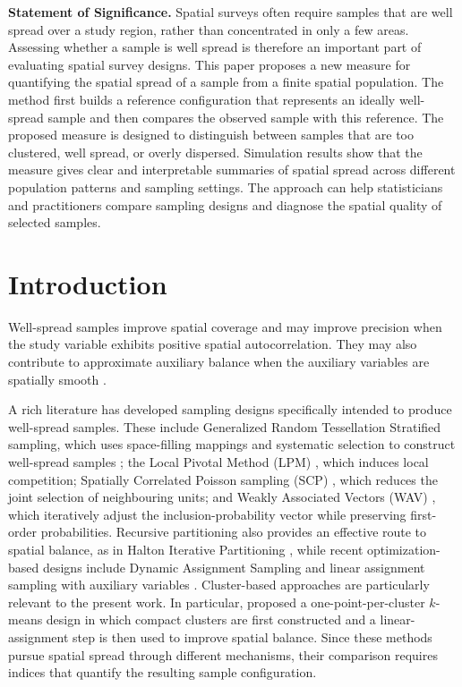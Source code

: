 \documentclass[12pt]{imsart}
\theoremstyle{plain}
\theoremstyle{remark}
\begin{document}
\noindent\textbf{Statement of Significance.}
Spatial surveys often require samples that are well spread over a study region,
rather than concentrated in only a few areas. Assessing whether a sample is
well spread is therefore an important part of evaluating spatial survey designs.
This paper proposes a new measure for quantifying the spatial spread of a
sample from a finite spatial population. The method first builds a reference
configuration that represents an ideally well-spread sample and then compares
the observed sample with this reference. The proposed measure is designed to
distinguish between samples that are too clustered, well spread, or overly
dispersed. Simulation results show that the measure gives clear and
interpretable summaries of spatial spread across different population patterns
and sampling settings. The approach can help statisticians and practitioners
compare sampling designs and diagnose the spatial quality of selected samples.

\section{Introduction}
Well-spread samples improve spatial coverage and may improve precision when the study variable exhibits positive spatial autocorrelation. They may also contribute to approximate auxiliary balance when the auxiliary variables are spatially
smooth \citep{graf:lund:13}.

A rich literature has developed sampling designs specifically intended to
produce well-spread samples. These include Generalized Random Tessellation Stratified sampling,
which uses space-filling mappings and systematic selection to construct
well-spread samples \citep{Stev:Olse:spat:2004};
the Local Pivotal Method (LPM) \citep{gra:lun:sch:12}, which induces local
competition; Spatially Correlated Poisson sampling (SCP) \citep{graf:11},
which reduces the joint selection of neighbouring units; and Weakly Associated
Vectors (WAV) \citep{jauslin2020spatial}, which iteratively adjust the
inclusion-probability vector while preserving first-order probabilities.
Recursive partitioning also provides an effective route to spatial balance,
as in Halton Iterative Partitioning \citep{robertson2018halton}, while recent
optimization-based designs include Dynamic Assignment Sampling
\citep{robertson2024} and linear assignment sampling with auxiliary variables
\citep{robertson2025}. Cluster-based approaches are particularly relevant to
the present work. In particular, \citet{robertson2024onepoint} proposed a
one-point-per-cluster \(k\)-means design in which compact clusters are first
constructed and a linear-assignment step is then used to improve spatial
balance. Since these methods pursue spatial spread through different
mechanisms, their comparison requires indices that quantify the resulting
sample configuration.
\end{document}
